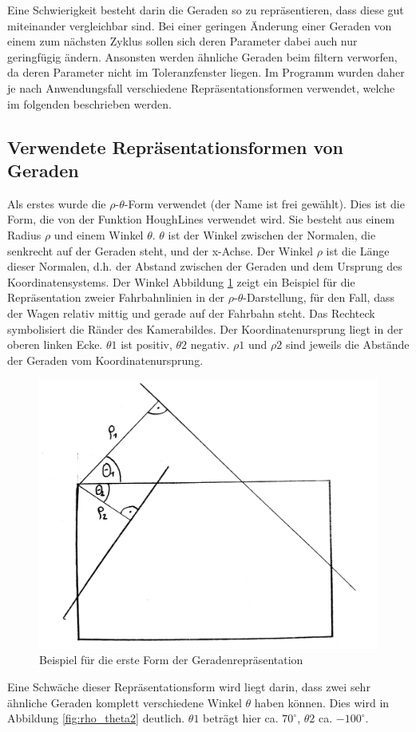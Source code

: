 \documentclass[a4paper,12pt]{article}
\begin{document}
	Eine Schwierigkeit besteht darin die Geraden so zu repräsentieren, dass diese gut miteinander vergleichbar sind. Bei einer geringen Änderung einer Geraden von einem zum nächsten Zyklus sollen sich deren Parameter dabei auch nur geringfügig ändern. Ansonsten werden ähnliche Geraden beim filtern verworfen, da deren Parameter nicht im Toleranzfenster liegen. Im Programm wurden daher je nach Anwendungsfall verschiedene Repräsentationsformen verwendet, welche im folgenden beschrieben werden.
	
	\subsection{Verwendete Repräsentationsformen von Geraden}
	
	Als erstes wurde die $\rho$-$\theta$-Form verwendet (der Name ist frei gewählt). Dies ist die Form, die von der Funktion HoughLines verwendet wird. Sie besteht aus einem Radius $\rho$ und einem Winkel $\theta$. $\theta$ ist der Winkel zwischen der Normalen, die senkrecht auf der Geraden steht, und der x-Achse. Der Winkel  $\rho$ ist die Länge dieser Normalen, d.h. der Abstand zwischen der Geraden und dem Ursprung des Koordinatensystems. Der Winkel 
	Abbildung \ref{fig:rho_theta1} zeigt ein Beispiel für die Repräsentation zweier Fahrbahnlinien in der $\rho$-$\theta$-Darstellung, für den Fall, dass der Wagen relativ mittig und gerade auf der Fahrbahn steht. Das Rechteck symbolisiert die Ränder des Kamerabildes. Der Koordinatenursprung liegt in der oberen linken Ecke. $\theta1$ ist positiv, $\theta2$ negativ. $\rho1$ und $\rho2$ sind jeweils die Abstände der Geraden vom Koordinatenursprung.
	
	\begin{figure}[H]
		\centering
		\includegraphics[width=.5\linewidth]{images/rho_theta1.jpg}
		\caption{Beispiel für die erste Form der Geradenrepräsentation}
		\label{fig:rho_theta1}
	\end{figure}
	
	Eine Schwäche dieser Repräsentationsform wird liegt darin, dass zwei sehr ähnliche Geraden komplett verschiedene Winkel $\theta$ haben können. Dies wird in Abbildung \ref{fig:rho_theta2} deutlich. $\theta1$ beträgt hier ca. $70^\circ$, $\theta2$ ca. $-100^\circ$.
	
\end{document}
